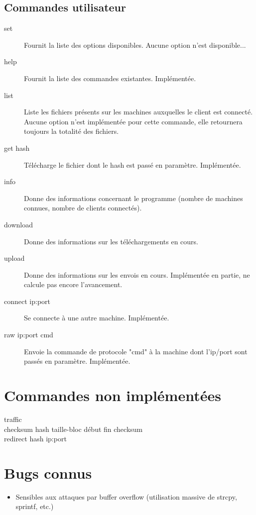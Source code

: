 \subsection{Commandes utilisateur}
\begin{description}

    \item[set] Fournit la liste des options disponibles. Aucune option n'est
    disponible...

    \item[help] Fournit la liste des commandes existantes. Implémentée.

    \item[list] Liste les fichiers présents sur les machines auxquelles le
    client est connecté. Aucune option n'est implémentée pour cette commande,
    elle retournera toujours la totalité des fichiers.

    \item[get hash] Télécharge le fichier dont le hash est passé en paramètre.
    Implémentée.

    \item[info] Donne des informations concernant le programme (nombre de
    machines connues, nombre de clients connectés).

    \item[download] Donne des informations sur les téléchargements en cours.

    \item[upload] Donne des informations sur les envois en cours. Implémentée
    en partie, ne calcule pas encore l'avancement.

    \item[connect ip:port] Se connecte à une autre machine. Implémentée.

    \item[raw ip:port cmd] Envoie la commande de protocole "cmd" à la machine
    dont l'ip/port sont passés en paramètre. Implémentée.

\end{description}



\section{Commandes non implémentées}
\begin{description}
    \item[traffic]
    \item[checksum hash taille-bloc début fin checksum] 
    \item[redirect hash ip:port]

\end{description}
\section{Bugs connus}
\begin{itemize}
    \item Sensibles aux attaques par buffer overflow (utilisation massive de
strcpy, sprintf, etc.)
\end{itemize}
